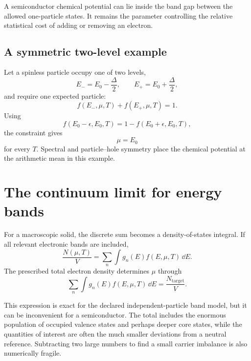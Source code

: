 A semiconductor chemical potential can lie inside the band gap between the
allowed one-particle states.  It remains the parameter controlling the relative
statistical cost of adding or removing an electron.

\subsection{A symmetric two-level example}

Let a spinless particle occupy one of two levels,
\begin{equation}
  E_-=E_0-\frac{\Delta}{2},
  \qquad
  E_+=E_0+\frac{\Delta}{2},
  \label{eq:symmetric-two-level-energies}
\end{equation}
and require one expected particle:
\begin{equation}
  f(E_-,\mu,T)+f(E_+,\mu,T)=1.
  \label{eq:symmetric-two-level-number-constraint}
\end{equation}
Using
\begin{equation}
  f(E_0-\epsilon,E_0,T)
  =1-f(E_0+\epsilon,E_0,T),
  \label{eq:fermi-symmetry-about-mu}
\end{equation}
the constraint gives
\begin{equation}
  \boxed{\mu=E_0}
  \label{eq:symmetric-two-level-chemical-potential}
\end{equation}
for every $T$.  Spectral and particle--hole symmetry place the chemical
potential at the arithmetic mean in this example.

\section{The continuum limit for energy bands}

For a macroscopic solid, the discrete sum becomes a density-of-states integral.
If all relevant electronic bands are included,
\begin{equation}
  \boxed{
  \frac{N(\mu,T)}{V}
  =\sum_n\int g_n(E)f(E,\mu,T)\,\dd E.
  }
  \label{eq:continuum-total-electron-number}
\end{equation}
The prescribed total electron density determines $\mu$ through
\begin{equation}
  \sum_n\int g_n(E)f(E,\mu,T)\,\dd E
  =\frac{N_{\mathrm{target}}}{V}.
  \label{eq:continuum-electron-number-closure}
\end{equation}

This expression is exact for the declared independent-particle band model, but
it can be inconvenient for a semiconductor.  The total includes the enormous
population of occupied valence states and perhaps deeper core states, while the
quantities of interest are often the much smaller deviations from a neutral
reference.  Subtracting two large numbers to find a small carrier imbalance is
also numerically fragile.

